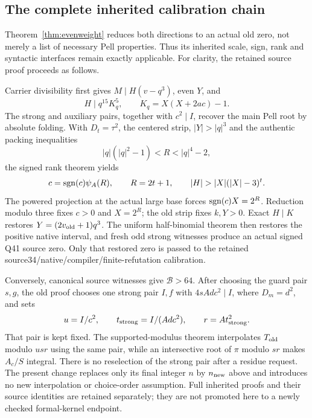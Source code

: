 \subsection{The complete inherited calibration chain}
Theorem~\ref{thm:evenweight} reduces both directions to an actual old
zero, not merely a list of necessary Pell properties. Thus its inherited
scale, sign, rank and syntactic interfaces remain exactly applicable.
For clarity, the retained source proof proceeds as follows.

Carrier divisibility first gives $M\mid H(v-q^3)$, even $Y$, and
\[
 H\mid q^{15}K_q^5,\qquad K_q=X(X+2ac)-1.
\]
The strong and auxiliary pairs, together with $c^2\mid I$, recover the
main Pell root by absolute folding. With $D_t=\tau^2$, the centered
strip, $|Y|>|q|^3$ and the authentic packing inequalities
\[
 |q|(|q|^2-1)<R<|q|^4-2,
\]
the signed rank theorem yields
\[
 c=\sgn(c)\psi_A(R),\qquad R=2t+1,
 \qquad |H|>|X|(|X|-3)^t.
\]
The powered projection at the actual large base forces
$\operatorname{sgn}(c)X=2^R$. Reduction modulo three fixes $c>0$ and $X=2^R$;
the old strip fixes $k,Y>0$. Exact $H\mid K$ restores
$Y=(2v_{\rm old}+1)q^3$. The uniform half-binomial theorem then restores
the positive native interval, and fresh odd strong witnesses produce an
actual signed Q41 source zero. Only that restored zero is passed to the
retained source34/native/compiler/finite-refutation calibration.

Conversely, canonical source witnesses give $\mathcal B>64$.
After choosing the guard pair $s,g$, the old proof chooses one strong
pair $I,f$ with $4sAdc^2\mid I$, where $D_m=d^2$, and sets
\[
 u=I/c^2,\qquad t_{\rm strong}=I/(Adc^2),\qquad
 r=At_{\rm strong}^2.
\]
That pair is kept fixed. The supported-modulus theorem interpolates
$T_{\rm old}$ modulo $usr$ using the same pair, while an intersective
root of $\pi$ modulo $sr$ makes $A_c/S$ integral. There is no reselection
of the strong pair after a residue request. The present change replaces
only its final integer $n$ by $n_{\rm new}$ above and introduces no new
interpolation or choice-order assumption. Full inherited proofs and their
source identities are retained separately; they are not promoted here to
a newly checked formal-kernel endpoint.

